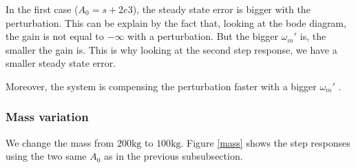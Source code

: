 In the first case ($A_0 = s+2e3$), the steady state error is bigger with the perturbation. This can be explain by the fact that, looking at the bode diagram, the gain is not equal to $- \infty$ with a perturbation.  
But the bigger $\omega_m'$ is, the smaller the gain is. This is why looking at the second step response, we have a smaller steady state error.

Moreover, the system is compensing the perturbation faster with a bigger $\omega_m'$ .

\subsubsection*{Mass variation}

We change the mass from $200\text{kg}$ to $100\text{kg}$. Figure \ref{mass} shows the step responses using the two same $A_0$ as in the previous subsubsection.

